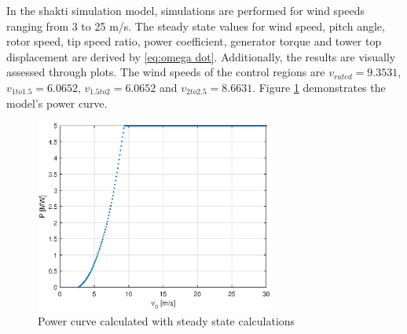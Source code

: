 In the \gls{shakti} simulation model, simulations are performed for wind speeds ranging from 3 to 25 m/s.
The steady state values for wind speed, pitch angle, rotor speed, tip speed ratio, power coefficient, generator torque and tower top displacement are derived by \ref{eq:omega dot}.
Additionally, the results are visually assessed through plots.
The wind speeds of the control regions are $v_{rated} = 9.3531$, $v_{1to1.5} = 6.0652$, $v_{1.5to2} = 6.0652$ and $v_{2to2.5} = 8.6631$. Figure \ref{fig:power cureve} demonstrates the model's power curve.

\begin{figure}[h]
	\centering
	\includegraphics[width=0.7\textwidth]{Figures/P_Vs_v.eps}
	\caption{Power curve calculated with steady state calculations}
	\label{fig:power cureve} 
\end{figure}
